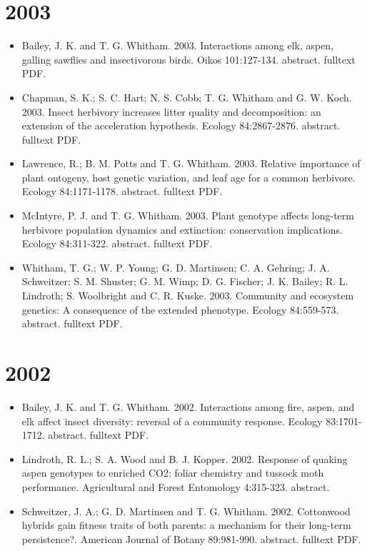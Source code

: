 \documentclass[12pt]{article}
\begin{document}
\section{2003}
\begin{itemize}
\item Bailey, J. K. and T. G. Whitham. 2003. Interactions among elk, aspen,
galling sawflies and insectivorous birds. Oikos
101:127-134. abstract. fulltext PDF.
 
\item Chapman, S. K.; S. C. Hart; N. S. Cobb; T. G. Whitham and
G. W. Koch. 2003. Insect herbivory increases litter quality and
decomposition: an extension of the acceleration hypothesis. Ecology
84:2867-2876. abstract. fulltext PDF.
 
\item Lawrence, R.; B. M. Potts and T. G. Whitham. 2003. Relative importance
of plant ontogeny, host genetic variation, and leaf age for a common
herbivore. Ecology 84:1171-1178. abstract. fulltext PDF.
 
\item McIntyre, P. J. and T. G. Whitham. 2003. Plant genotype affects
long-term herbivore population dynamics and extinction: conservation
implications. Ecology 84:311-322. abstract. fulltext PDF.
 
\item Whitham, T. G.; W. P. Young; G. D. Martinsen; C. A. Gehring;
J. A. Schweitzer; S. M. Shuster; G. M. Wimp; D. G. Fischer;
J. K. Bailey; R. L. Lindroth; S. Woolbright and
C. R. Kuske. 2003. Community and ecosystem genetics: A consequence of
the extended phenotype. Ecology 84:559-573. abstract. fulltext PDF.
 
\end{itemize}

\section{2002}
\begin{itemize}
\item Bailey, J. K. and T. G. Whitham. 2002. Interactions among fire, aspen,
and elk affect insect diversity: reversal of a community
response. Ecology 83:1701-1712. abstract. fulltext PDF.
 
\item Lindroth, R. L.; S. A. Wood and B. J. Kopper. 2002. Response of
quaking aspen genotypes to enriched CO2: foliar chemistry and tussock
moth performance. Agricultural and Forest Entomology
4:315-323. abstract.
 
\item Schweitzer, J. A.; G. D. Martinsen and T. G. Whitham. 2002. Cottonwood
hybrids gain fitness traits of both parents: a mechanism for their
long-term persistence?. American Journal of Botany
89:981-990. abstract. fulltext PDF.
 
\end{itemize}
\end{document}
